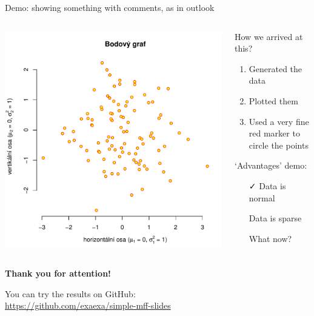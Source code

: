 \documentclass[aspectratio=169]{beamer}
\begin{document}
\begin{frame}{Demo: showing something with comments, as in outlook}
\begin{columns}
\begin{column}{0.5\textwidth}
\includegraphics[width=\linewidth]{img/ukazka-obr01.pdf}
\end{column}
\begin{column}{0.5\textwidth}
How we arrived at this?
\begin{enumerate}
\item Generated the data
\item Plotted them
\item Used a very fine red marker to circle the points
\end{enumerate}

`Advantages' demo:

\begin{itemize}
\item[\color{green}\faCheck] Data is normal
\item[\color{red}\faTimes] Data is sparse
\item[\color{violet}\faQuestionCircle] What now?
\end{itemize}
\end{column}
\end{columns}
\end{frame}

\begin{frame}[plain]
\centering
{\Large\bfseries Thank you for attention!}

You can try the results on GitHub: \\
\url{https://github.com/exaexa/simple-mff-slides}

\end{frame}
\end{document}
